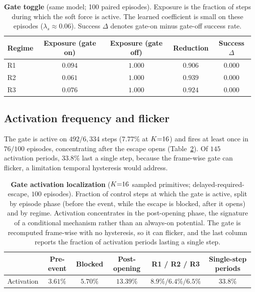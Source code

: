 \begin{table}[htbp]
\centering
\caption{\textbf{Gate toggle} (same model; 100 paired episodes). Exposure is the
fraction of steps during which the soft force is active. The learned coefficient
is small on these episodes ($\lambda_s \approx 0.06$). Success $\Delta$ denotes
gate-on minus gate-off success rate.}
\label{tab:app_gate_toggle}
\small
\setlength{\tabcolsep}{6pt}
\renewcommand{\arraystretch}{1.1}
\begin{tabular}{lcccc}
\toprule
Regime & Exposure (gate on) & Exposure (gate off) & Reduction & Success $\Delta$ \\
\midrule
R1 & $0.094$ & $1.000$ & $0.906$ & $0.000$ \\
R2 & $0.061$ & $1.000$ & $0.939$ & $0.000$ \\
R3 & $0.076$ & $1.000$ & $0.924$ & $0.000$ \\
\bottomrule
\end{tabular}
\end{table}

\subsection{Activation frequency and flicker}
\label{app:activation}
The gate is active on $492/6{,}334$ steps ($7.77\%$ at $K{=}16$) and fires at
least once in $76/100$ episodes, concentrating after the escape opens
(Table~\ref{tab:app_activation}). Of $145$ activation periods, $33.8\%$ last a
single step, because the frame-wise gate can flicker, a limitation temporal hysteresis
would address.

\begin{table}[htbp]
\centering
\caption{\textbf{Gate activation localization} ($K{=}16$ sampled primitives;
delayed-required-escape, $100$ episodes). Fraction of control steps at which the
gate is active, split by episode phase (before the event, while the escape is
blocked, after it opens) and by regime. Activation concentrates in the
post-opening phase, the signature of a conditional mechanism rather than an
always-on potential. The gate is recomputed frame-wise with no hysteresis, so
it can flicker, and the last column reports the fraction of activation periods
lasting a single step.}
\label{tab:app_activation}
\small\setlength{\tabcolsep}{6pt}\renewcommand{\arraystretch}{1.1}
\begin{tabular}{lccccc}
\toprule
 & Pre-event & Blocked & Post-opening & R1 / R2 / R3 & Single-step periods \\
\midrule
Activation & $3.61\%$ & $5.70\%$ & $13.39\%$ & $8.9\%/6.4\%/6.5\%$ & $33.8\%$ \\
\bottomrule
\end{tabular}
\end{table}

